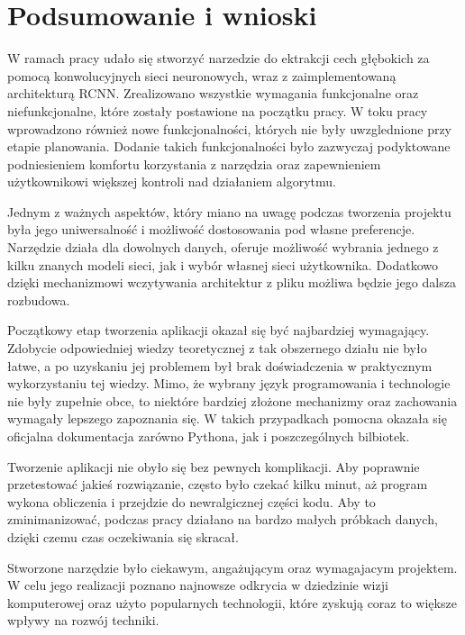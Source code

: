 \documentclass[a4paper,twoside,12pt]{book}
\newcounter{stronyPozaNumeracja}
\begin{document}
{\chapter{Podsumowanie i wnioski}
{W ramach pracy udało się stworzyć narzedzie do ektrakcji cech głębokich za pomocą konwolucyjnych sieci neuronowych, wraz z zaimplementowaną architekturą RCNN. Zrealizowano wszystkie wymagania funkcjonalne oraz niefunkcjonalne, które zostały postawione na początku pracy. W toku pracy wprowadzono również nowe funkcjonalności, których nie były uwzglednione przy etapie planowania. Dodanie takich funkcjonalności było zazwyczaj podyktowane podniesieniem komfortu korzystania z narzędzia oraz zapewnieniem użytkownikowi większej kontroli nad działaniem algorytmu.}

{Jednym z ważnych aspektów, który miano na uwagę podczas tworzenia projektu była jego uniwersalność i możliwość dostosowania pod własne preferencje. Narzędzie działa dla dowolnych danych, oferuje możliwość wybrania jednego z kilku znanych modeli sieci, jak i wybór własnej sieci użytkownika. Dodatkowo dzięki mechanizmowi wczytywania architektur z pliku możliwa będzie jego dalsza rozbudowa.}

{Początkowy etap tworzenia aplikacji okazał się być najbardziej wymagający. Zdobycie odpowiedniej wiedzy teoretycznej z tak obszernego działu nie było łatwe, a po uzyskaniu jej problemem był brak doświadczenia w praktycznym wykorzystaniu tej wiedzy. Mimo, że wybrany język programowania i technologie nie były zupełnie obce, to niektóre bardziej złożone mechanizmy oraz zachowania wymagały lepszego zapoznania się. W takich przypadkach pomocna okazała się oficjalna dokumentacja zarówno Pythona, jak i poszczególnych bilbiotek.}

{Tworzenie aplikacji nie obyło się bez pewnych komplikacji. Aby poprawnie przetestować jakieś rozwiązanie, często było czekać kilku minut, aż program wykona obliczenia i przejdzie do newralgicznej części kodu. Aby to zminimanizować, podczas pracy działano na bardzo małych próbkach danych, dzięki czemu czas oczekiwania się skracał.}

{Stworzone narzędzie było ciekawym, angażującym oraz wymagajacym projektem. W celu jego realizacji poznano najnowsze odkrycia w dziedzinie wizji komputerowej oraz użyto popularnych technologii, które zyskują coraz to większe wpływy na rozwój techniki.}



 
 

\backmatter 
{}
\setcounter{page}{\value{stronyPozaNumeracja}}
\pagestyle{tylkoNumeryStron}
 
}
\end{document}
